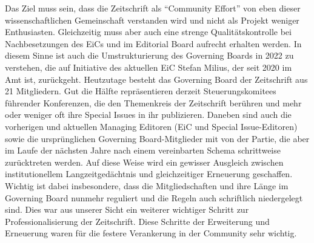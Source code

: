 \documentclass[a4paper,
fontsize=11pt,
oneside,
numbers=noperiodatend,
parskip=half-,
bibliography=totoc,
final
]{scrartcl}
\begin{document}
Das Ziel muss sein, dass die Zeitschrift als \enquote{Community Effort}
von eben dieser wissenschaftlichen Gemeinschaft verstanden wird und
nicht als Projekt weniger Enthusiasten. Gleichzeitig muss aber auch eine
strenge Qualitätskontrolle bei Nachbesetzungen des EiCs und im Editorial
Board aufrecht erhalten werden. In diesem Sinne ist auch die
Umstrukturierung des Governing Boards in 2022 zu verstehen, die auf
Initiative des aktuellen EiC Stefan Milius, der seit 2020 im Amt ist,
zurückgeht. Heutzutage besteht das Governing Board der Zeitschrift aus
21 Mitgliedern. Gut die Hälfte repräsentieren derzeit Steuerungskomitees
führender Konferenzen, die den Themenkreis der Zeitschrift berühren und
mehr oder weniger oft ihre Special Issues in ihr publizieren. Daneben
sind auch die vorherigen und aktuellen Managing Editoren (EiC und
Special Issue-Editoren) sowie die ursprünglichen Governing
Board-Mitglieder mit von der Partie, die aber im Laufe der nächsten
Jahre nach einem vereinbarten Schema schrittweise zurücktreten werden.
Auf diese Weise wird ein gewisser Ausgleich zwischen institutionellem
Langzeitgedächtnis und gleichzeitiger Erneuerung geschaffen. Wichtig ist
dabei insbesondere, dass die Mitgliedschaften und ihre Länge im
Governing Board nunmehr reguliert und die Regeln auch schriftlich
niedergelegt sind. Dies war aus unserer Sicht ein weiterer wichtiger
Schritt zur Professionalisierung der Zeitschrift. Diese Schritte der
Erweiterung und Erneuerung waren für die festere Verankerung in der
Community sehr wichtig.
\end{document}
